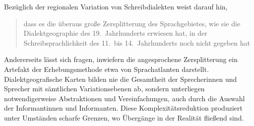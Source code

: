 Bezüglich der regionalen Variation von Schreibdialekten weist \citet{solms2014}
darauf hin, \blockcquote[132]{solms2014}{dass es die überaus große
Zersplitterung des Sprachgebietes, wie sie die Dialektgeographie des
19.~Jahrhunderts erwiesen hat, in der Schreibsprachlichkeit des 11.\ bis
14.~Jahrhunderts noch nicht gegeben hat}. Andererseits lässt sich fragen,
inwiefern die angesprochene Zersplitterung ein Artefakt der Erhebungsmethode
etwa von Sprachatlanten darstellt. Dialektgeografische Karten bilden nie die
Gesamtheit der Sprecherinnen und Sprecher mit sämtlichen Variations\-ebenen ab,
sondern unterliegen notwendigerweise Abstraktionen und Vereinfachungen, auch
durch die Auswahl der Informantinnen und Informanten. Diese
Komplexitätsreduktion produziert unter Umständen scharfe Grenzen, wo Übergänge
in der Realität fließend sind.
